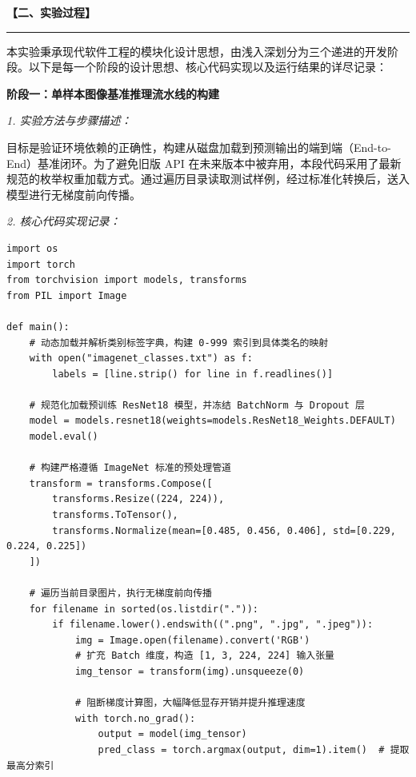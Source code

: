 \documentclass[a4paper,12pt]{article}
\newenvironment{sectionbox}[1]
{%
    \begin{center}
    \fboxrule=1pt
    \fboxsep=8pt
    \begin{minipage}{0.98\textwidth}
    \textbf{#1}
    \par\vspace{4pt}
    \hrule
    \vspace{6pt}
}
{%
    \end{minipage}
    \end{center}
}
\begin{document}
\begin{sectionbox}{【二、实验过程】}


本实验秉承现代软件工程的模块化设计思想，由浅入深划分为三个递进的开发阶段。以下是每一个阶段的设计思想、核心代码实现以及运行结果的详尽记录：

\vspace{6pt}
\textbf{阶段一：单样本图像基准推理流水线的构建}

\vspace{4pt}
\textit{1. 实验方法与步骤描述：}

目标是验证环境依赖的正确性，构建从磁盘加载到预测输出的端到端（End-to-End）基准闭环。为了避免旧版 API 在未来版本中被弃用，本段代码采用了最新规范的枚举权重加载方式。通过遍历目录读取测试样例，经过标准化转换后，送入模型进行无梯度前向传播。

\vspace{4pt}
\textit{2. 核心代码实现记录：}

\begin{lstlisting}
import os
import torch
from torchvision import models, transforms
from PIL import Image

def main():
    # 动态加载并解析类别标签字典，构建 0-999 索引到具体类名的映射
    with open("imagenet_classes.txt") as f:
        labels = [line.strip() for line in f.readlines()]

    # 规范化加载预训练 ResNet18 模型，并冻结 BatchNorm 与 Dropout 层
    model = models.resnet18(weights=models.ResNet18_Weights.DEFAULT)
    model.eval()

    # 构建严格遵循 ImageNet 标准的预处理管道
    transform = transforms.Compose([
        transforms.Resize((224, 224)),
        transforms.ToTensor(),
        transforms.Normalize(mean=[0.485, 0.456, 0.406], std=[0.229, 0.224, 0.225])
    ])

    # 遍历当前目录图片，执行无梯度前向传播
    for filename in sorted(os.listdir(".")):
        if filename.lower().endswith((".png", ".jpg", ".jpeg")):
            img = Image.open(filename).convert('RGB')
            # 扩充 Batch 维度，构造 [1, 3, 224, 224] 输入张量
            img_tensor = transform(img).unsqueeze(0)

            # 阻断梯度计算图，大幅降低显存开销并提升推理速度
            with torch.no_grad():
                output = model(img_tensor)
                pred_class = torch.argmax(output, dim=1).item()  # 提取最高分索引


\end{lstlisting}
\end{sectionbox}
\end{document}
